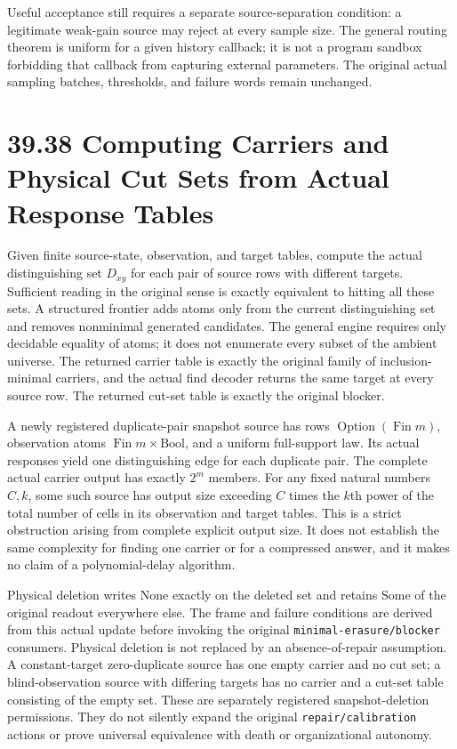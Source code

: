 \documentclass[
  english,
  11pt,
  oneside]{book}
\begin{document}
Useful acceptance still requires a separate source-separation condition: a legitimate weak-gain source may reject at every sample size. The general routing theorem is uniform for a given history callback; it is not a program sandbox forbidding that callback from capturing external parameters. The original actual sampling batches, thresholds, and failure words remain unchanged.

\section{39.38 Computing Carriers and Physical Cut Sets from Actual Response Tables}\label{computing-carriers-and-physical-cut-sets-from-actual-response-tables}

Given finite source-state, observation, and target tables, compute the actual distinguishing set \(D_{xy}\) for each pair of source rows with different targets. Sufficient reading in the original sense is exactly equivalent to hitting all these sets. A structured frontier adds atoms only from the current distinguishing set and removes nonminimal generated candidates. The general engine requires only decidable equality of atoms; it does not enumerate every subset of the ambient universe. The returned carrier table is exactly the original family of inclusion-minimal carriers, and the actual find decoder returns the same target at every source row. The returned cut-set table is exactly the original blocker.

A newly registered duplicate-pair snapshot source has rows \(\operatorname{Option}(\operatorname{Fin}m)\), observation atoms \(\operatorname{Fin}m\times\mathrm{Bool}\), and a uniform full-support law. Its actual responses yield one distinguishing edge for each duplicate pair. The complete actual carrier output has exactly \(2^m\) members. For any fixed natural numbers \(C,k\), some such source has output size exceeding \(C\) times the \(k\)th power of the total number of cells in its observation and target tables. This is a strict obstruction arising from complete explicit output size. It does not establish the same complexity for finding one carrier or for a compressed answer, and it makes no claim of a polynomial-delay algorithm.

Physical deletion writes None exactly on the deleted set and retains Some of the original readout everywhere else. The frame and failure conditions are derived from this actual update before invoking the original \nolinkurl{minimal-erasure/blocker} consumers. Physical deletion is not replaced by an absence-of-repair assumption. A constant-target zero-duplicate source has one empty carrier and no cut set; a blind-observation source with differing targets has no carrier and a cut-set table consisting of the empty set. These are separately registered snapshot-deletion permissions. They do not silently expand the original \nolinkurl{repair/calibration} actions or prove universal equivalence with death or organizational autonomy.
\end{document}
